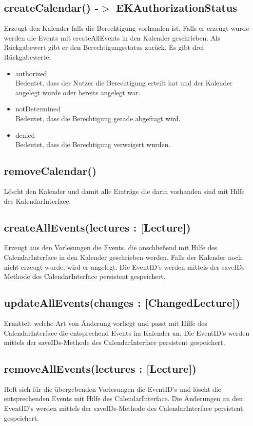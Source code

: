 \subsection[createCalendar]{createCalendar() -$>$ EKAuthorizationStatus}
Erzeugt den Kalender falls die Berechtigung vorhanden ist. Falls er erzeugt wurde werden die Events mit createAllEvents in den Kalender geschrieben. Als Rückgabewert gibt er den Berechtigungsstatus zurück. Es gibt drei Rückgabewerte:
\begin{itemize}
     \item authorized \\[0.5em]
     Bedeutet, dass der Nutzer die Berechtigung erteilt hat und der Kalender angelegt wurde oder bereits angelegt war.
     \item notDetermined \\[0.5em]
     Bedeutet, dass die Berechtigung gerade abgefragt wird.
     \item denied \\[0.5em]
     Bedeutet, dass die Berechtigung verweigert wurden.
\end{itemize}

\subsection[removeCalendar]{removeCalendar()}
Löscht den Kalender und damit alle Einträge die darin vorhanden sind mit Hilfe des KalendarInterface.

\subsection[createAllEvents]{createAllEvents(lectures : [Lecture])}
Erzeugt aus den Vorlesungen die Events, die anschließend mit Hilfe des CalendarInterface in den Kalender geschrieben werden.
Falls der Kalender noch nicht erzeugt wurde, wird er angelegt.
Die EventID's werden mittels der saveIDs-Methode des CalendarInterface persistent gespeichert.

\subsection[updateAllEvents]{updateAllEvents(changes : [ChangedLecture])}
Ermittelt welche Art von Änderung vorliegt und passt mit Hilfe des CalendarInterface die  entsprechend Events im Kalender an.
Die EventID's werden mittels der saveIDs-Methode des CalendarInterface persistent gespeichert.

\subsection[removeAllEvents]{removeAllEvents(lectures : [Lecture])}
Holt sich für die übergebenden Vorlesungen die EventID's und löscht die entsprechenden Events mit Hilfe des CalendarInterface.
Die Änderungen an den EventID's werden mittels der saveIDs-Methode des CalendarInterface persistent gespeichert.

